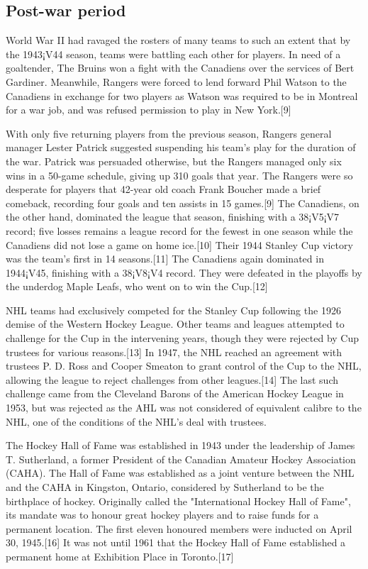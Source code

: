 \documentclass[conference]{IEEEtran}
\begin{document}
\subsection{Post-war period}
World War II had ravaged the rosters of many teams to such an extent
that by the 1943¡V44 season, teams were battling each other for
players. In need of a goaltender, The Bruins won a fight with the
Canadiens over the services of Bert Gardiner. Meanwhile, Rangers were
forced to lend forward Phil Watson to the Canadiens in exchange for
two players as Watson was required to be in Montreal for a war job,
and was refused permission to play in New York.[9]

With only five returning players from the previous season, Rangers
general manager Lester Patrick suggested suspending his team's play
for the duration of the war. Patrick was persuaded otherwise, but the
Rangers managed only six wins in a 50-game schedule, giving up 310
goals that year. The Rangers were so desperate for players that
42-year old coach Frank Boucher made a brief comeback, recording four
goals and ten assists in 15 games.[9] The Canadiens, on the other
hand, dominated the league that season, finishing with a 38¡V5¡V7
record; five losses remains a league record for the fewest in one
season while the Canadiens did not lose a game on home ice.[10] Their
1944 Stanley Cup victory was the team's first in 14 seasons.[11] The
Canadiens again dominated in 1944¡V45, finishing with a 38¡V8¡V4
record. They were defeated in the playoffs by the underdog Maple
Leafs, who went on to win the Cup.[12]

NHL teams had exclusively competed for the Stanley Cup following the
1926 demise of the Western Hockey League. Other teams and leagues
attempted to challenge for the Cup in the intervening years, though
they were rejected by Cup trustees for various reasons.[13] In 1947,
the NHL reached an agreement with trustees P. D. Ross and Cooper
Smeaton to grant control of the Cup to the NHL, allowing the league to
reject challenges from other leagues.[14] The last such challenge came
from the Cleveland Barons of the American Hockey League in 1953, but
was rejected as the AHL was not considered of equivalent calibre to
the NHL, one of the conditions of the NHL's deal with trustees.

The Hockey Hall of Fame was established in 1943 under the leadership
of James T. Sutherland, a former President of the Canadian Amateur
Hockey Association (CAHA). The Hall of Fame was established as a joint
venture between the NHL and the CAHA in Kingston, Ontario, considered
by Sutherland to be the birthplace of hockey. Originally called the
"International Hockey Hall of Fame", its mandate was to honour great
hockey players and to raise funds for a permanent location. The first
eleven honoured members were inducted on April 30, 1945.[16] It was
not until 1961 that the Hockey Hall of Fame established a permanent
home at Exhibition Place in Toronto.[17]
\end{document}
